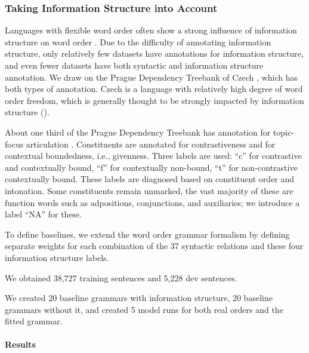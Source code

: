 
\subsubsection{Taking Information Structure into Account}\label{sec:czech}

Languages with flexible word order often show a strong influence of information structure on word order \CITE.
Due to the difficulty of annotating information structure, only relatively few datasets have annotations for information structure, and even fewer datasets have both syntactic and information structure annotation.
We draw on the Prague Dependency Treebank of Czech \CITE, which has both types of annotation.
Czech is a language with relatively high degree of word order freedom, which is generally thought to be strongly impacted by information structure (\CITE).

About one third of the Prague Dependency Treebank has annotation for topic-focus articulation \citep{mikulova2006annotation}.
Constituents are annotated for contrastiveness and for contextual boundedness, i.e., givenness.
Three labels are used:
``c'' for contrastive and contextually bound, ``f'' for contextually non-bound, ``t'' for non-contrastive contextually bound.
These labels are diagnosed based on constituent order and intonation.
Some constituents remain unmarked, the vast majority of these are function words such as adpositions, conjunctions, and auxiliaries; we introduce a label ``NA'' for these.

To define baselines, we extend the word order grammar formalism by defining separate weights for each combination of the 37 syntactic relations and these four information structure labels.

We obtained 38,727 training sentences and 5,228 dev sentences.

We created 20 baseline grammars with information structure, 20 baseline grammars without it, and created 5 model runs for both real orders and the fitted grammar.

\paragraph{Results}

